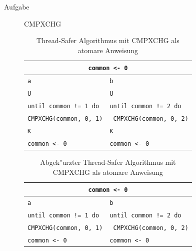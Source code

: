 \documentclass[a4paper,twoside,12pt,fleqn]{article}
\newcounter{AUFGNR}
\newcommand{\AUFGABE}[2]{\vspace{0.3cm}\item[Aufgabe~\arabic{AUFGNR}]\stepcounter{AUFGNR} #1\hfill\emph{#2}}
\begin{document}
\begin{description}
	\AUFGABE{CMPXCHG}{}
	\begin{table}[h]
		\centering
		\begin{tabularx}{0.75\textwidth}{l | l}
			\multicolumn{2}{c}{\texttt{common <- 0}}                                                 \\
			\hline
			\texttt{a}                                 & \texttt{b}                                  \\
			\hline
			\texttt{U}                                 & \texttt{U}                                  \\
			\texttt{until common != 1 do}              & \texttt{until common != 2 do}               \\
			\texttt{\hspace{2em}CMPXCHG(common, 0, 1)} & \texttt{\hspace{2em} CMPXCHG(common, 0, 2)} \\
			\texttt{K}                                 & \texttt{K}                                  \\
			\texttt{common <- 0}                       & \texttt{common <- 0}                        \\
		\end{tabularx}
		\caption{Thread-Safer Algorithmus mit CMPXCHG als atomare Anweisung}
	\end{table}

	\begin{table}[h]
		\centering
		\begin{tabularx}{0.75\textwidth}{l | l}
			\multicolumn{2}{c}{\texttt{common <- 0}}                                                 \\
			\hline
			\texttt{a}                                 & \texttt{b}                                  \\
			\hline
			\texttt{until common != 1 do}              & \texttt{until common != 2 do}               \\
			\texttt{\hspace{2em}CMPXCHG(common, 0, 1)} & \texttt{\hspace{2em} CMPXCHG(common, 0, 2)} \\
			\texttt{common <- 0}                       & \texttt{common <- 0}                        \\
		\end{tabularx}
		\caption{Abgek"urzter Thread-Safer Algorithmus mit CMPXCHG als atomare Anweisung}
	\end{table}


\end{description}
\end{document}
